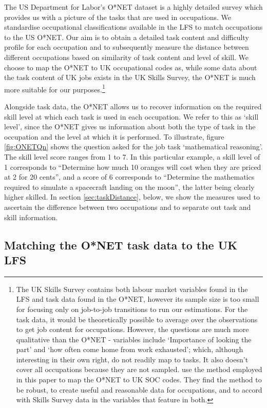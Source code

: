 \documentclass[11pt, oneside]{article}
\begin{document}
	The US Department for Labor's O*NET dataset is a highly detailed survey which provides us with a picture of the tasks that are used in occupations. We standardise occupational classifications available in the LFS to match occupations to the US O*NET. Our aim is to obtain a detailed task content and difficulty profile for each occupation and to subsequently measure the distance between different occupations based on similarity of task content and level of skill. We choose to map the O*NET to UK occupational codes as, while some data about the task content of UK jobs exists in the UK Skills Survey, the O*NET is much more suitable for our purposes.\footnote{The UK Skills Survey contains both labour market variables found in the LFS and task data found in the O*NET, however its sample size is too small for focusing only on job-to-job transitions to run our estimations. For the task data, it would be theoretically possible to average over the observations to get job content for occupations. However, the questions are much more qualitative than the O*NET - variables include `Importance of looking the part' and `how often come home from work exhausted'; which, although interesting in their own right, do not readily map to tasks. It also doesn't cover all occupations because they are not sampled. \cite{ONETreport} use the method employed in this paper to map the O*NET to UK SOC codes. They find the method to be robust, to create useful and reasonable data for occupations, and to accord with Skills Survey data in the variables that feature in both.} 
	
	Alongside task data, the O*NET allows us to recover information on the required skill level at which each task is used in each occupation. We refer to this as `skill level', since the O*NET gives us information about both the type of task in the occupation and the level at which it is performed. To illustrate, figure \ref{fig:ONETQn} shows the question asked for the job task `mathematical reasoning'. The skill level score ranges from 1 to 7. In this particular example, a skill level of 1 corresponds to ``Determine how much 10 oranges will cost when they are priced at 2 for 20 cents'', and a score of 6 corresponds to ``Determine the mathematics required to simulate a spacecraft landing on the moon'', the latter being clearly higher skilled. In section \ref{sec:taskDistance}, below, we show the measures used to ascertain the difference between two occupations and to separate out task and skill information. 
	
	\subsection{Matching the O*NET task data to the UK LFS}
\label{sec:matchLFSONET}
\end{document}
